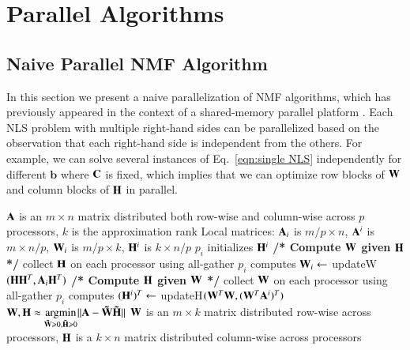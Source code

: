 \section{Parallel Algorithms}
\label{sec:parallel}

\subsection{Naive Parallel NMF Algorithm} 
\label{sec:naive}

In this section we present a naive parallelization of NMF algorithms, which has previously appeared in the context of a shared-memory parallel platform \cite{Fairbanks2015}. 
Each NLS problem with multiple right-hand sides can be parallelized based on the observation that each right-hand side is independent from the others. 
For example, we can solve several instances of Eq.~\eqref{eqn:single NLS} independently for different $\mathbf{b}$ where $\CC$ is fixed, which implies that we can optimize row blocks of $\WW$ and column blocks of $\HH$ in parallel. 



\begin{algorithm}[t!]
\caption{$[\WW,\HH] = \text{\NaiveAlg}(\AA,k)$}
\label{alg:naive}
\begin{algorithmic}[1]
\Require $\AA$ is an $m\times n$ matrix distributed both row-wise and column-wise across $p$ processors, $k$ is the approximation rank
\Require Local matrices: $\AA_{i}$ is $m/p\times n$, $\AA^{i}$ is $m\times n/p$, $\WW_i$ is $m/p\times k$, $\HH^i$ is $k\times n/p$
\State $p_i$ initializes $\HH^i$
	\Statex \quad\; \textbf{/* Compute $\WW$ given $\HH$ */} 
	\State collect $\HH$ on each processor using all-gather
		\label{line:naive:allgatherH}
	\State $p_i$ computes $\WW_i \gets$ updateW$(\HH\HH^T,\AA_i\HH^T)$
		\label{line:naive:computeW}
	\Statex \quad\; \textbf{/* Compute $\HH$ given $\WW$ */} 
	\State collect $\WW$ on each processor using all-gather
		\label{line:naive:allgatherW}
	\State $p_i$ computes $(\HH^i)^T \gets$ updateH$(\WW^T\WW,(\WW^T\AA^i)^T)$
		\label{line:naive:computeH}
\EndWhile
\Ensure $\displaystyle \WW, \HH \approx \Argmin{\M{\tilde W} \geq 0, \M{\tilde H} \geq 0} \|\AA- \M{\tilde W} \M{\tilde H}\|$
\Ensure $\WW$ is an $m\times k$ matrix distributed row-wise across processors, $\HH$ is a $k\times n$ matrix distributed column-wise across processors
\end{algorithmic}
\end{algorithm}

